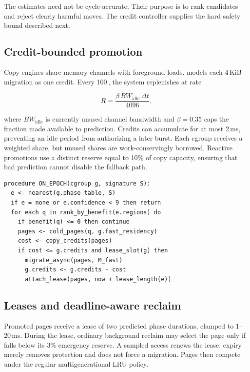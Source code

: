The estimates need not be cycle-accurate.  Their purpose is to rank candidates
and reject clearly harmful moves.  The credit controller supplies the hard
safety bound described next.

\subsection{Credit-bounded promotion}

Copy engines share memory channels with foreground loads.  \system models each
4\,KiB migration as one credit.  Every 100\,\us, the system replenishes at rate

\begin{equation}
  R = \frac{\beta\,BW_{\mathrm{idle}}\,\Delta t}{4096},
  \label{eq:credits}
\end{equation}

where $BW_{\mathrm{idle}}$ is currently unused channel bandwidth and
$\beta=0.35$ caps the fraction made available to prediction.  Credits can
accumulate for at most 2\,ms, preventing an idle period from authorizing a later
burst.  Each cgroup receives a weighted share, but unused shares are
work-conservingly borrowed.  Reactive promotions use a distinct reserve equal
to 10\% of copy capacity, ensuring that bad prediction cannot disable the
fallback path.

\begin{lstlisting}[float=t,caption={Promotion at an epoch boundary.},
                   label={lst:promotion}]
procedure ON_EPOCH(cgroup g, signature S):
  e <- nearest(g.phase_table, S)
  if e = none or e.confidence < 9 then return
  for each q in rank_by_benefit(e.regions) do
    if benefit(q) <= 0 then continue
    pages <- cold_pages(q, g.fast_residency)
    cost <- copy_credits(pages)
    if cost <= g.credits and lease_slot(g) then
      migrate_async(pages, M_fast)
      g.credits <- g.credits - cost
      attach_lease(pages, now + lease_length(e))
\end{lstlisting}

\subsection{Leases and deadline-aware reclaim}

Promoted pages receive a lease of two predicted phase durations, clamped to
1--20\,ms.  During the lease, ordinary background reclaim may select the page
only if \fast falls below its 3\% emergency reserve.  A sampled access renews
the lease; expiry merely removes protection and does not force a migration.
Pages then compete under the regular multigenerational LRU policy.

